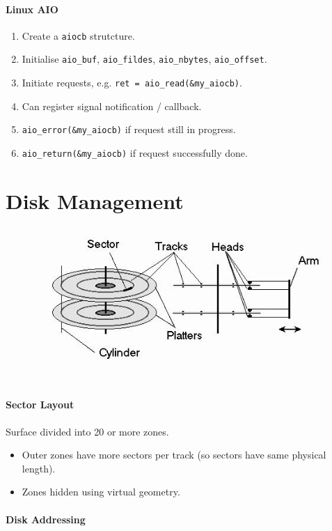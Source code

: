 \documentclass[twocolumn,english]{article}
\begin{document}
\paragraph{Linux AIO}
\begin{enumerate}
\item Create a \texttt{aiocb} strutcture.
\item Initialise \texttt{aio\_buf}, \texttt{aio\_fildes}, \texttt{aio\_nbytes},
\texttt{aio\_offset}.
\item Initiate requests, e.g. \texttt{ret = aio\_read(\&my\_aiocb)}.
\item Can register signal notification / callback.
\item \texttt{aio\_error(\&my\_aiocb)} if request still in progress.
\item \texttt{aio\_return(\&my\_aiocb)} if request successfully done.
\end{enumerate}

\section{Disk Management}

\begin{figure}[H]
\centering{}\includegraphics[width=0.4\linewidth]{img/disk} 
\end{figure}



\paragraph{Sector Layout}

Surface divided into 20 or more zones. 
\begin{itemize}
\item Outer zones have more sectors per track (so sectors have same physical
length). 
\item Zones hidden using virtual geometry. 
\end{itemize}

\paragraph{Disk Addressing}
\end{document}
